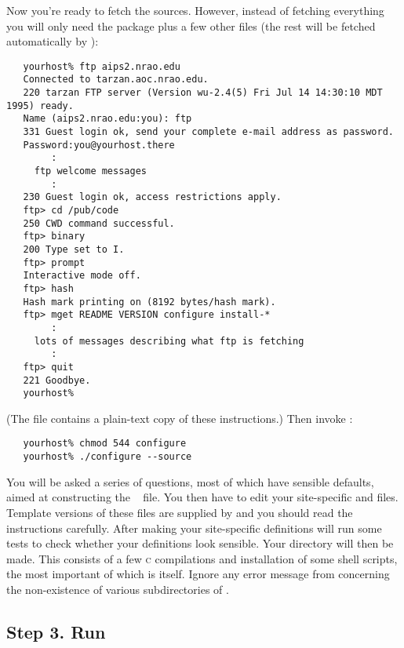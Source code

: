 \noindent
Now you're ready to fetch the sources.  However, instead of fetching
everything you will only need the  package plus a few other
files (the rest will be fetched automatically by ):

\begin{verbatim}
   yourhost% ftp aips2.nrao.edu
   Connected to tarzan.aoc.nrao.edu.
   220 tarzan FTP server (Version wu-2.4(5) Fri Jul 14 14:30:10 MDT 1995) ready.
   Name (aips2.nrao.edu:you): ftp
   331 Guest login ok, send your complete e-mail address as password.
   Password:you@yourhost.there
        :
     ftp welcome messages
        :
   230 Guest login ok, access restrictions apply.
   ftp> cd /pub/code
   250 CWD command successful.
   ftp> binary
   200 Type set to I.
   ftp> prompt
   Interactive mode off.
   ftp> hash
   Hash mark printing on (8192 bytes/hash mark).
   ftp> mget README VERSION configure install-*
        :
     lots of messages describing what ftp is fetching
        :
   ftp> quit
   221 Goodbye.
   yourhost%
\end{verbatim}

\noindent
(The  file contains a plain-text copy of these instructions.)
Then invoke :

\begin{verbatim}
   yourhost% chmod 544 configure
   yourhost% ./configure --source
\end{verbatim}

\noindent
You will be asked a series of questions, most of which have sensible defaults,
aimed at constructing the \aipspp\  file.  You then have to
edit your site-specific  and  files.  Template
versions of these files are supplied by  and you should read
the instructions carefully.  After making your site-specific definitions
 will run some tests to check whether your 
definitions look sensible.  Your  directory will then be made.
This consists of a few \textsc{c} compilations and installation of some shell
scripts, the most important of which is  itself.  Ignore any
error message from  concerning the non-existence of various
subdirectories of .

\subsection*{Step 3. Run }

